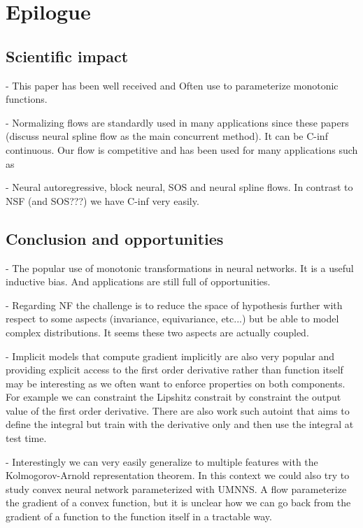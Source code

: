\section{Epilogue} \label{epi:ch05}

\subsection{Scientific impact}
- This paper has been well received and Often use to parameterize monotonic functions.

- Normalizing flows are standardly used in many applications since these papers (discuss neural spline flow as the main concurrent method). It can be C-inf continuous. Our flow is competitive and has been used for many applications such as

- Neural autoregressive, block neural, SOS and neural spline flows. In contrast to NSF (and SOS???) we have C-inf very easily.

\subsection{Conclusion and opportunities}
- The popular use of monotonic transformations in neural networks. It is a useful inductive bias. And applications are still full of opportunities.

- Regarding NF the challenge is to reduce the space of hypothesis further with respect to some aspects (invariance, equivariance, etc...) but be able to model complex distributions. It seems these two aspects are actually coupled.

- Implicit models that compute gradient implicitly are also very popular and providing explicit access to the first order derivative rather than function itself may be interesting as we often want to enforce properties on both components. For example we can constraint the Lipshitz constrait by constraint the output value of the first order derivative. There are also work such autoint that aims to define the integral but train with the derivative only and then use the integral at test time.

- Interestingly we can very easily generalize to multiple features with the Kolmogorov-Arnold representation theorem. In this context we could also try to study convex neural network parameterized with UMNNS. A flow parameterize the gradient of a convex function, but it is unclear how we can go back from the gradient of a function to the function itself in a tractable way.
